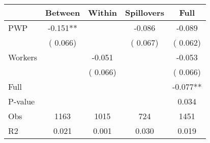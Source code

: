 
\begin{tabular}{l*{4}{c}}\hline&\multicolumn{1}{c}{Between}&\multicolumn{1}{c}{Within}&\multicolumn{1}{c}{Spillovers}&\multicolumn{1}{c}{Full}\\ \hline
 PWP           &             -0.151**      &                                               &       -0.086 &        -0.089                            \\ 
                               &        (       0.066)           &                                       &       (       0.067)     &      (       0.062)                                           \\ 
 Workers       &                                               &       -0.051    &                                &            -0.053                            \\ 
                               &                                               & (       0.066)                  &                                        &      (       0.066)                                           \\ 
\hline                                                                                                                                                                                                                                            
 Full                  &                                               &                                               &                                        &            -0.077**                                     \\ 
 P-value               &                                               &                                               &                                        &             0.034                                           \\ 
 Obs                   &               1163               &       1015                       &       724                &              1451                                               \\ 
 R2                    &                      0.021              &              0.001                      &              0.030               &                     0.019                                              \\ 
\hline \end{tabular}                                                                                                                                                                                                              